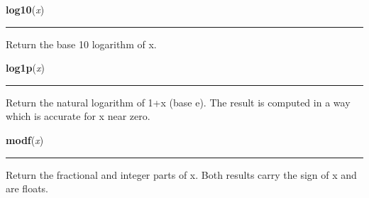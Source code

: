     \label{math:log10}

    \vspace{0.5ex}

\hspace{.8\funcindent}\begin{boxedminipage}{\funcwidth}

    \raggedright \textbf{log10}(\textit{x})

    \vspace{-1.5ex}

    \rule{\textwidth}{0.5\fboxrule}
\setlength{\parskip}{2ex}
    Return the base 10 logarithm of x.

\setlength{\parskip}{1ex}
    \end{boxedminipage}

    \label{math:log1p}

    \vspace{0.5ex}

\hspace{.8\funcindent}\begin{boxedminipage}{\funcwidth}

    \raggedright \textbf{log1p}(\textit{x})

    \vspace{-1.5ex}

    \rule{\textwidth}{0.5\fboxrule}
\setlength{\parskip}{2ex}
    Return the natural logarithm of 1+x (base e). The result is computed in
    a way which is accurate for x near zero.

\setlength{\parskip}{1ex}
    \end{boxedminipage}

    \label{math:modf}

    \vspace{0.5ex}

\hspace{.8\funcindent}\begin{boxedminipage}{\funcwidth}

    \raggedright \textbf{modf}(\textit{x})

    \vspace{-1.5ex}

    \rule{\textwidth}{0.5\fboxrule}
\setlength{\parskip}{2ex}
    Return the fractional and integer parts of x.  Both results carry the 
    sign of x and are floats.

\setlength{\parskip}{1ex}
    \end{boxedminipage}

